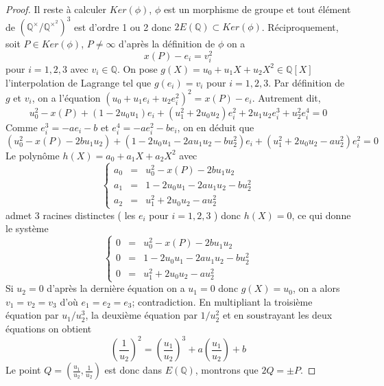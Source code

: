 \documentclass{article}
\begin{document}
\begin{proof}
Il reste à calculer $Ker(\phi)$, $\phi$ est un morphisme de groupe et tout élément de 
$(\mathbb{Q}^{\times}/\mathbb{Q}^{\times^2})^3$ est d'ordre 1 ou 2 donc $2E(\mathbb{Q}) \subset Ker(\phi)$.
Réciproquement, soit $P \in Ker(\phi)$, $P \neq \infty$ d'après la définition de $\phi$ on a
\begin{equation*}
x(P) - e_{i} = v_{i}^2
\end{equation*}
pour $i=1,2,3$ avec $v_{i} \in \mathbb{Q}$. 
On pose $g(X) = u_{0} + u_{1}X + u_{2}X^2 \in \mathbb{Q}[X]$ l'interpolation de Lagrange tel que 
$g(e_{i}) = v_{i}$ pour $i=1,2,3$. Par définition de $g$ et $v_{i}$, on a l'équation 
$(u_{0}+u_{1}e_{i}+u_{2}e_{i}^2)^2 = x(P) - e_{i}$. Autrement dit,
\begin{equation*}
u_{0}^2 - x(P) + (1-2u_{0}u_{1})e_{i} + (u_{1}^2 + 2u_{0}u_{2})e_{i}^2 + 2u_{1}u_{2}e_{i}^3 + u_{2}^2e_{i}^4 = 0
\end{equation*}
Comme $e_{i}^3 = -ae_{i} - b$ et $e_{i}^4 = -ae_{i}^2 - be_{i}$, on en déduit que
\begin{equation*}
(u_{0}^2 - x(P) - 2bu_{1}u_{2}) + (1-2u_{0}u_{1}-2au_{1}u_{2}-bu_{2}^2)e_{i} + (u_{1}^2 + 2u_{0}u_{2} - au_{2}^2)e_{i}^2 = 0
\end{equation*}
Le polynôme $h(X) = a_{0} + a_{1}X + a_{2}X^2$ avec
\begin{equation*}
\left\lbrace
\begin{array}{lcl}
a_{0} &=& u_{0}^2 - x(P) - 2bu_{1}u_{2}\\
a_{1} &=& 1-2u_{0}u_{1}-2au_{1}u_{2}-bu_{2}^2\\
a_{2} &=& u_{1}^2 + 2u_{0}u_{2} - au_{2}^2
\end{array}\right.
\end{equation*}
admet 3 racines distinctes ( les $e_{i}$ pour $i=1,2,3$ ) donc $h(X) = 0$, ce qui donne le système
\begin{equation*}
\left\lbrace
\begin{array}{lcl}
0 &=& u_{0}^2 - x(P) - 2bu_{1}u_{2}\\
0 &=& 1-2u_{0}u_{1}-2au_{1}u_{2}-bu_{2}^2\\
0 &=& u_{1}^2 + 2u_{0}u_{2} - au_{2}^2
\end{array}\right.
\end{equation*}
Si $u_{2} = 0$ d'après la dernière équation on a $u_{1} = 0$ donc $g(X) = u_{0}$, on a alors $v_{1} = v_{2} = v_{3}$
d'où $e_{1} = e_{2} = e_{3}$; contradiction. En multipliant la troisième équation par $u_{1}/u_{2}^3$, la deuxième équation 
par $1/u_{2}^2$ et en soustrayant les deux équations on obtient
\begin{equation*}
(\frac{1}{u_{2}})^2 = (\frac{u_{1}}{u_{2}})^3 + a(\frac{u_{1}}{u_{2}}) + b
\end{equation*}
Le point $Q = (\frac{u_{1}}{u_{2}}, \frac{1}{u_{2}})$ est donc dans $E(\mathbb{Q})$, montrons que $2Q = \pm P$.


\end{proof}
\end{document}
